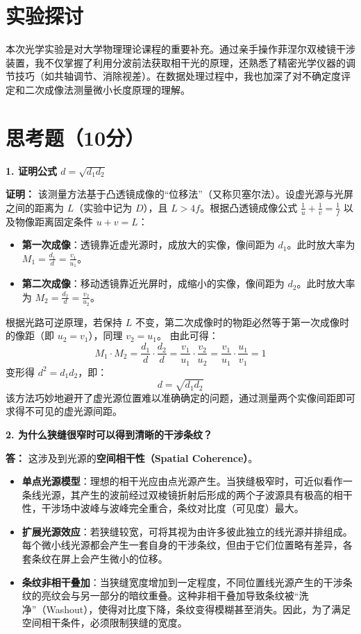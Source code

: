 \documentclass[]{../../templates/Report}%
\begin{document}
\begin{fullreportonly}
\section{实验探讨}
本次光学实验是对大学物理理论课程的重要补充。通过亲手操作菲涅尔双棱镜干涉装置，我不仅掌握了利用分波前法获取相干光的原理，还熟悉了精密光学仪器的调节技巧（如共轴调节、消除视差）。在数据处理过程中，我也加深了对不确定度评定和二次成像法测量微小长度原理的理解。


\section{思考题（10分）}

\textbf{1. 证明公式 $d = \sqrt{d_1 d_2}$}

\noindent\textbf{证明：} 
该测量方法基于凸透镜成像的“位移法”（又称贝塞尔法）。设虚光源与光屏之间的距离为 $L$（实验中记为 $D$），且 $L > 4f$。根据凸透镜成像公式 $\frac{1}{u} + \frac{1}{v} = \frac{1}{f}$ 以及物像距离固定条件 $u + v = L$：
\begin{itemize}
    \item \textbf{第一次成像}：透镜靠近虚光源时，成放大的实像，像间距为 $d_1$。此时放大率为 $M_1 = \frac{d_1}{d} = \frac{v_1}{u_1}$。
    \item \textbf{第二次成像}：移动透镜靠近光屏时，成缩小的实像，像间距为 $d_2$。此时放大率为 $M_2 = \frac{d_2}{d} = \frac{v_2}{u_2}$。
\end{itemize}
根据光路可逆原理，若保持 $L$ 不变，第二次成像时的物距必然等于第一次成像时的像距（即 $u_2 = v_1$），同理 $v_2 = u_1$。
由此可得：
\[
M_1 \cdot M_2 = \frac{d_1}{d} \cdot \frac{d_2}{d} = \frac{v_1}{u_1} \cdot \frac{v_2}{u_2} = \frac{v_1}{u_1} \cdot \frac{u_1}{v_1} = 1
\]
变形得 $d^2 = d_1 d_2$，即：
\[
d = \sqrt{d_1 d_2}
\]
该方法巧妙地避开了虚光源位置难以准确确定的问题，通过测量两个实像间距即可求得不可见的虚光源间距。

\medskip
\textbf{2. 为什么狭缝很窄时可以得到清晰的干涉条纹？}

\noindent\textbf{答：} 这涉及到光源的\textbf{空间相干性（Spatial Coherence）}。
\begin{itemize}
    \item \textbf{单点光源模型}：理想的相干光应由点光源产生。当狭缝极窄时，可近似看作一条线光源，其产生的波前经过双棱镜折射后形成的两个子波源具有极高的相干性，干涉场中波峰与波峰完全重合，条纹对比度（可见度）最大。
    \item \textbf{扩展光源效应}：若狭缝较宽，可将其视为由许多彼此独立的线光源并排组成。每个微小线光源都会产生一套自身的干涉条纹，但由于它们位置略有差异，各套条纹在屏上会产生微小的位移。
    \item \textbf{条纹非相干叠加}：当狭缝宽度增加到一定程度，不同位置线光源产生的干涉条纹的亮纹会与另一部分的暗纹重叠。这种非相干叠加导致条纹被“洗净”（Washout），使得对比度下降，条纹变得模糊甚至消失。因此，为了满足空间相干条件，必须限制狭缝的宽度。
\end{itemize}


\end{fullreportonly}
\end{document}
